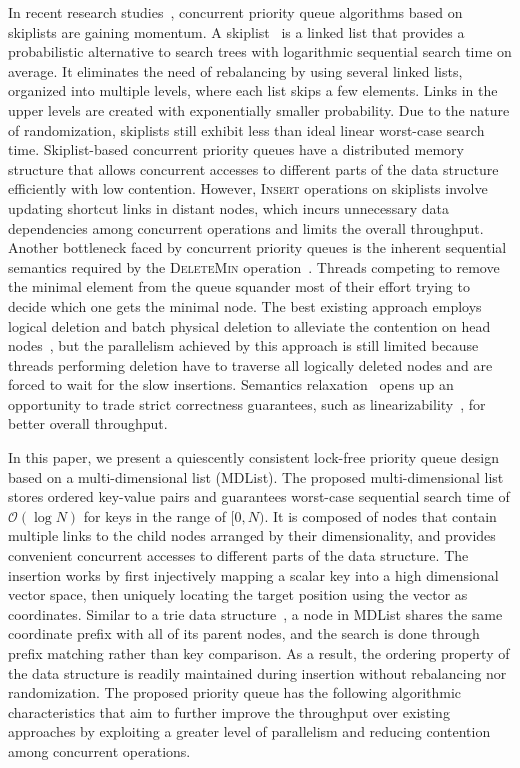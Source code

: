 \documentclass[10pt,journal,letterpaper,compsoc]{IEEEtran}
\begin{document}
In recent research studies~\cite{linden2013skiplist,sundell2005fast,herlihy2006provably,fraser2007concurrent}, concurrent priority queue algorithms based on skiplists are gaining momentum.
A skiplist~\cite{pugh1990skip} is a linked list that provides a probabilistic alternative to search trees with logarithmic sequential search time on average. 
It eliminates the need of rebalancing by using several linked lists, organized into multiple levels, where each list skips a few elements. 
Links in the upper levels are created with exponentially smaller probability.
Due to the nature of randomization, skiplists still exhibit less than ideal linear worst-case search time.
Skiplist-based concurrent priority queues have a distributed memory structure that allows concurrent accesses to different parts of the data structure efficiently with low contention. 
However, \textsc{Insert} operations on skiplists involve updating shortcut links in distant nodes, which incurs unnecessary data dependencies among concurrent operations and limits the overall throughput.
Another bottleneck faced by concurrent priority queues is the inherent sequential semantics required by the \textsc{DeleteMin} operation~\cite{ellen2012inherent}.
Threads competing to remove the minimal element from the queue squander most of their effort trying to decide which one gets the minimal node.
The best existing approach employs logical deletion and batch physical deletion to alleviate the contention on head nodes~\cite{linden2013skiplist}, but the parallelism achieved by this approach is still limited because threads performing deletion have to traverse all logically deleted nodes and are forced to wait for the slow insertions.
Semantics relaxation~\cite{henzinger2013quantitative} opens up an opportunity to trade strict correctness guarantees, such as linearizability~\cite{herlihy1990linearizability}, for better overall throughput.

In this paper, we present a quiescently consistent lock-free priority queue design based on a multi-dimensional list (MDList).
The proposed multi-dimensional list stores ordered key-value pairs and guarantees worst-case sequential search time of $\mathcal{O}(\log N)$ for keys in the range of $[0,N)$.
It is composed of nodes that contain multiple links to the child nodes arranged by their dimensionality, and provides convenient concurrent accesses to different parts of the data structure.
The insertion works by first injectively mapping a scalar key into a high dimensional vector space, then uniquely locating the target position using the vector as coordinates.
Similar to a trie data structure~\cite{willard1983log}, a node in MDList shares the same coordinate prefix with all of its parent nodes, and the search is done through prefix matching rather than key comparison.
As a result, the ordering property of the data structure is readily maintained during insertion without rebalancing nor randomization.
The proposed priority queue has the following algorithmic characteristics that aim to further improve the throughput over existing approaches by exploiting a greater level of parallelism and reducing contention among concurrent operations.
\end{document}
